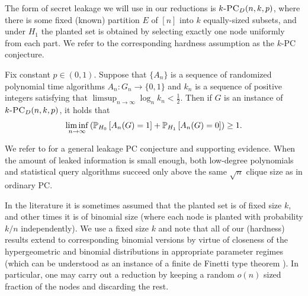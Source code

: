 \documentclass[final,12pt]{colt2023} %
\newcommand\1[1]{\mathbb{I}_{\left\{#1\right\}}}
\begin{document}



The form of secret leakage we will use in our reductions is $k\textsc{-PC}_D(n, k, p)$, where there is some fixed (known) partition $E$ of $[n]$ into $k$ equally-sized subsets, and under $H_1$ the planted set is obtained by selecting exactly one node uniformly from each part. We refer to the corresponding hardness assumption as the $k$-PC conjecture.

\begin{conjecture}[$k$-PC Conjecture] \label{conj: secret leak}
Fix constant $p \in (0, 1)$. Suppose that $\{ A_n \}$ is a sequence of randomized polynomial time algorithms $A_n : G_n \to \{0, 1\}$ and $k_n$ is a sequence of positive integers satisfying that $\limsup_{n \to \infty} \log_n k_n < \frac{1}{2}$. Then if $G$ is an instance of $k\textsc{-PC}_D(n, k, p)$, it holds that
$$\liminf_{n \to \infty} \left( \P_{H_0}\left[A_n(G) = 1\right] + \P_{H_1}\left[A_n(G) = 0\right] \right) \ge 1.$$ 
\end{conjecture}
We refer to \cite{BB20} for a general leakage PC conjecture and supporting evidence. When the amount of leaked information is small enough, 
both low-degree polynomials and statistical query algorithms succeed only above the same $\sqrt{n}$ clique size as in ordinary PC. 

\begin{remark}\label{rmk:1} In the literature it is sometimes assumed that the planted set is of fixed size $k$, and other times it is of binomial size (where each node is planted with probability $k/n$ independently). We use a fixed size $k$ and note that all of our (hardness) results extend to corresponding binomial versions by virtue of closeness of the hypergeometric and binomial distributions in appropriate parameter regimes (which can be understood as an instance of a finite de Finetti type theorem \cite{diaconis1980finite}). In particular, one may carry out a reduction by keeping a random $o(n)$ sized fraction of the nodes and discarding the rest. %
\end{remark}
\end{document}
